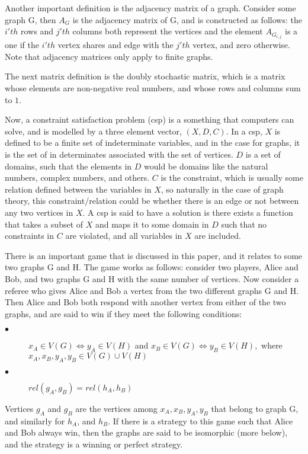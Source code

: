 \documentclass[12pt]{article}
\begin{document}
Another important definition is the adjacency matrix of a graph. Consider some graph G, then $A_G$ is the adjacency matrix of G, and is constructed as follows: the $i'th$ rows and $j'th$ columns both represent the vertices and the element $A_{G_{i, j}}$ is a one if the $i'th$ vertex shares and edge with the $j'th$ vertex, and zero otherwise. Note that adjacency matrices only apply to finite graphs.

The next matrix definition is the \hypertarget{stochastic}{doubly stochastic matrix}, which is a matrix whose elements are non-negative real numbers, and whose rows and columns sum to $1$.

Now, a constraint satisfaction problem (csp) is a something that computers can solve, and is modelled by a three element vector, $(X, D, C)$. In a csp, $X$ is defined to be a finite set of indeterminate variables, and in the case for graphs, it is the set of in determinates associated with the set of vertices. $D$ is a set of domains, such that the elements in $D$ would be domains like the natural numbers, complex numbers, and others. $C$ is the constraint, which is usually some relation defined between the variables in $X$, so naturally in the case of graph theory, this constraint/relation could be whether there is an edge or not between any two vertices in $X$. A csp is said to have a solution is there exists a function that takes a subset of $X$ and maps it to some domain in $D$ such that no constraints in $C$ are violated, and all variables in $X$ are included.

There is an important game that is discussed in this paper, and it relates to some two graphs G and H. The game works as follows: consider two players, Alice and Bob, and two graphs G and H with the same number of vertices. Now consider a referee who gives Alice and Bob a vertex from the two different graphs G and H. Then Alice and Bob both respond with another vertex from either of the two graphs, and are said to win if they meet the following conditions:
\begin{description}
  \item[$\bullet$] $x_A \in V(G) \Leftrightarrow y_A \in V(H)$ and  $x_B \in V(G)\Leftrightarrow y_B \in V(H), $ where $x_A, x_B, y_A, y_B \in V(G) \cup V(H)$
  \item[$\bullet$] $rel(g_A, g_B) = rel(h_A, h_B)$
\end{description}
Vertices $g_A$ and $g_B$ are the vertices among $x_A, x_B, y_A, y_B$ that belong to graph G, and similarly for $h_A$, and $h_B$.
If there is a strategy to this game such that Alice and Bob always win, then the graphs are said to be isomorphic (more below), and the strategy is a winning or perfect strategy. 
\end{document}
